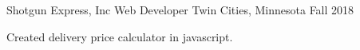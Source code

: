 \begin{cventries}
  \cventry
    {Shotgun Express, Inc}
    {Web Developer}
    {Twin Cities, Minnesota} %
    {Fall 2018} %
    {
      \begin{cvitems} %
        \item {Created delivery price calculator in javascript.}
      \end{cvitems}
    }


\end{cventries}
